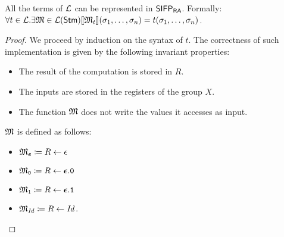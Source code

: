 \begin{lemma}
  \label{lemma:lpwtermsifp}
All the terms of $\mathcal{L}$ can be represented in $\mathsf{SIFP_{{\mathsf{RA}}}}$. Formally: $\forall t \in \mathcal{L}. \exists \mathfrak M\in {\mathcal L ({\mathsf{Stm}})} \llbracket\mathfrak M_t\rrbracket(\sigma_1, \ldots, \sigma_n)= t(\sigma_1, \ldots, \sigma_n)$.
\end{lemma}


\begin{proof}
We proceed by induction on the syntax of $t$. The correctness of such implementation is given by the following invariant properties:
\begin{itemize}
\item The result of the computation is stored in $R$.
\item The inputs are stored in the registers of the group $X$.
\item The function $\mathfrak M$ does not write the values it accesses as input.
\end{itemize}
\noindent
$\mathfrak M$ is defined as follows:
\begin{itemize}
\item $\mathfrak M_{\bm{\epsilon}}\coloneqq R \leftarrow \epsilon $
\item $\mathfrak M_{\mathtt{0}}\coloneqq R \leftarrow \bm{\epsilon}.\mathtt{0} $
\item $\mathfrak M_{\mathtt{1}}\coloneqq R \leftarrow \bm{\epsilon}.\mathtt{1} $
\item $\mathfrak M_{\mathit{Id}}\coloneqq R \leftarrow \mathit{Id}$.
\end{itemize}


\end{proof}
